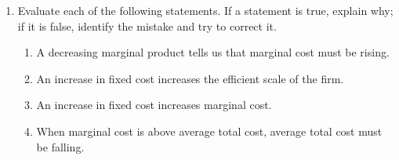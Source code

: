 \documentclass{article}
\begin{document}
\begin{enumerate}
\begin{enumerate}
	\item To maximize her profit, Renata should produce until the marginal cost of producing another set is greater than the revenue she would earn from selling that set. How many sets of earrings should she produce?
	
	\end{enumerate}
	
	For the rest of the problem assume that she produces the amount you found in part (c).
	
	\begin{enumerate}
	
	\setcounter{enumii}{3}
	\item What are Renata's total explicit costs?
	
	\item What are her total implicit costs?
	
	\item What is her economic profit?
	
	\item What is her accounting profit?
	
	\end{enumerate}
	
\item Evaluate each of the following statements. If a statement is true, explain why; if it is false, identify the mistake and try to correct it.

	\begin{enumerate}
	
	\item A decreasing marginal product tells us that marginal cost must be rising.
	
	\item An increase in fixed cost increases the efficient scale of the firm.
	
	\item An increase in fixed cost increases marginal cost.
	
	\item When marginal cost is above average total cost, average total cost must be falling.
	
	\end{enumerate}

\end{enumerate}
\end{document}
